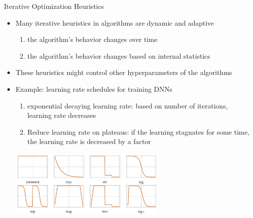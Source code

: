 \begin{frame}[c]{Iterative Optimization Heuristics}
	
	\begin{itemize}
		\item Many iterative heuristics in algorithms are dynamic and adaptive
		\begin{enumerate}
			\item the algorithm's behavior changes over time
			\item the algorithm's behavior changes based on internal statistics
		\end{enumerate}
		\medskip
		\pause
		\item These heuristics might control other hyperparameters of the algorithms
		\pause
		\smallskip
		\item Example: learning rate schedules for training DNNs
		\begin{enumerate}
			\item exponential decaying learning rate: based on number of iterations, learning rate decreases
			\pause
			\item Reduce learning rate on plateaus: if the learning stagnates for some time,\\ the learning rate is decreased by a factor
		\end{enumerate}
		
		\centering
		\includegraphics[width=0.6\textwidth]{images/learning_rates}
		
	\end{itemize}
	
\end{frame}
	
